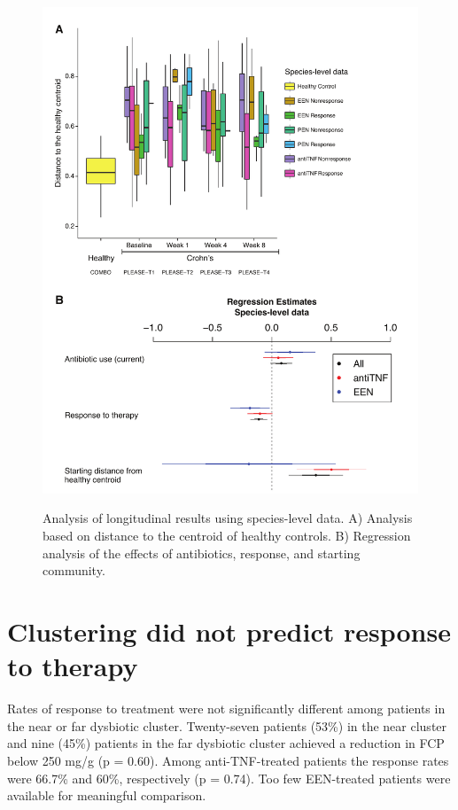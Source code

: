 \begin{figure}[p]
\centering
{\includegraphics[scale=0.6,trim=0 0 0 0,clip]{Figure/F2S4_distance_species.pdf}}
\caption[Analysis of longitudinal results using species-level data.]{Analysis of longitudinal results using species-level data. A) Analysis based on distance to the centroid of healthy controls. B) Regression analysis of the effects of antibiotics, response, and starting community.
}
\label{F2S4_distance_species}
\end{figure}



\section{ Clustering did not predict response to therapy }
Rates of response to treatment were not significantly different among patients in the near or far dysbiotic cluster. Twenty-seven patients (53\%) in the near cluster and nine (45\%) patients in the far dysbiotic cluster achieved a reduction in FCP below 250 mg/g (p = 0.60). Among anti-TNF-treated patients the response rates were 66.7\% and 60\%, respectively (p = 0.74). Too few EEN-treated patients were available for meaningful comparison.

